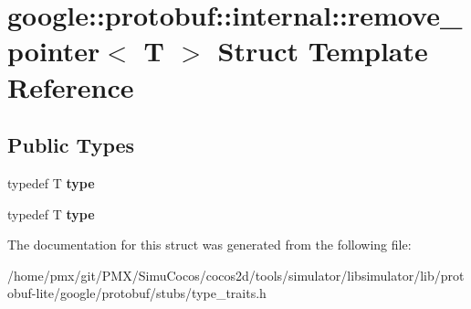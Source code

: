 \hypertarget{structgoogle_1_1protobuf_1_1internal_1_1remove__pointer}{}\section{google\+:\+:protobuf\+:\+:internal\+:\+:remove\+\_\+pointer$<$ T $>$ Struct Template Reference}
\label{structgoogle_1_1protobuf_1_1internal_1_1remove__pointer}
\subsection*{Public Types}
\begin{DoxyCompactItemize}
\item 
\mbox{\label{structgoogle_1_1protobuf_1_1internal_1_1remove__pointer_a2c2e3aa338c64bc914b091f32a372847}} 
typedef T {\bfseries type}
\item 
\mbox{\label{structgoogle_1_1protobuf_1_1internal_1_1remove__pointer_a2c2e3aa338c64bc914b091f32a372847}} 
typedef T {\bfseries type}
\end{DoxyCompactItemize}


The documentation for this struct was generated from the following file\+:\begin{DoxyCompactItemize}
\item 
/home/pmx/git/\+P\+M\+X/\+Simu\+Cocos/cocos2d/tools/simulator/libsimulator/lib/protobuf-\/lite/google/protobuf/stubs/type\+\_\+traits.\+h\end{DoxyCompactItemize}
